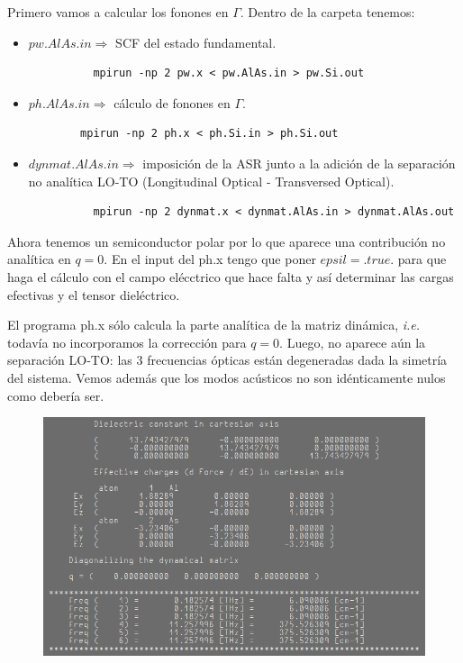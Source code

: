  Primero vamos a calcular los fonones en $\Gamma$. Dentro de la carpeta tenemos:
    \begin{itemize}
      \item $pw.AlAs.in \Rightarrow$ SCF del estado fundamental.
        \begin{verbatim}
          mpirun -np 2 pw.x < pw.AlAs.in > pw.Si.out
        \end{verbatim}
      \item $ph.AlAs.in \Rightarrow$ cálculo de fonones en $\Gamma$.
      \begin{verbatim}
        mpirun -np 2 ph.x < ph.Si.in > ph.Si.out
      \end{verbatim}
      \item $dynmat.AlAs.in \Rightarrow$ imposición de la ASR junto a la adición de la separación no analítica LO-TO (Longitudinal Optical - Transversed Optical).
      \begin{verbatim}
          mpirun -np 2 dynmat.x < dynmat.AlAs.in > dynmat.AlAs.out
      \end{verbatim}
    \end{itemize}

  Ahora tenemos un semiconductor polar por lo que aparece una contribución no analítica en $q=0$. En el input del ph.x tengo que poner $epsil = .true.$ para que haga el cálculo con el campo elécctrico que hace falta y así determinar las cargas efectivas y el tensor dieléctrico.

  El programa ph.x sólo calcula la parte analítica de la matriz dinámica, \emph{i.e.} todavía no incorporamos la corrección para $q=0$. Luego, no aparece aún la separación LO-TO: las 3 frecuencias ópticas están degeneradas dada la simetría del sistema. Vemos además que los modos acústicos no son idénticamente nulos como debería ser.

  \begin{figure}[H]
      \centering
      \includegraphics[scale = 0.6]{figs/D5/AlAs_pre.png}
  \end{figure}

